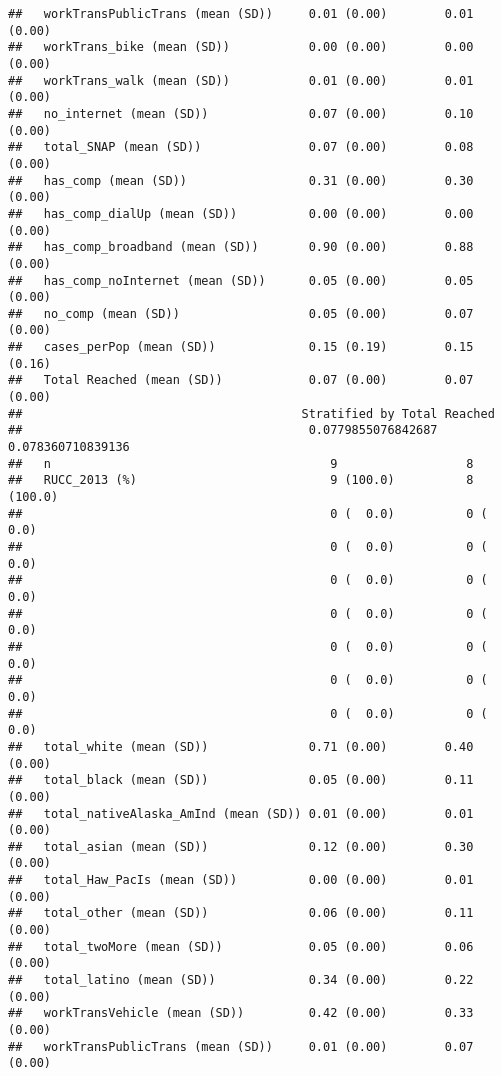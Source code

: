 \documentclass[
]{article}
\begin{document}
\begin{verbatim}
##   workTransPublicTrans (mean (SD))     0.01 (0.00)        0.01 (0.00)       
##   workTrans_bike (mean (SD))           0.00 (0.00)        0.00 (0.00)       
##   workTrans_walk (mean (SD))           0.01 (0.00)        0.01 (0.00)       
##   no_internet (mean (SD))              0.07 (0.00)        0.10 (0.00)       
##   total_SNAP (mean (SD))               0.07 (0.00)        0.08 (0.00)       
##   has_comp (mean (SD))                 0.31 (0.00)        0.30 (0.00)       
##   has_comp_dialUp (mean (SD))          0.00 (0.00)        0.00 (0.00)       
##   has_comp_broadband (mean (SD))       0.90 (0.00)        0.88 (0.00)       
##   has_comp_noInternet (mean (SD))      0.05 (0.00)        0.05 (0.00)       
##   no_comp (mean (SD))                  0.05 (0.00)        0.07 (0.00)       
##   cases_perPop (mean (SD))             0.15 (0.19)        0.15 (0.16)       
##   Total Reached (mean (SD))            0.07 (0.00)        0.07 (0.00)       
##                                       Stratified by Total Reached
##                                        0.0779855076842687 0.078360710839136
##   n                                       9                  8             
##   RUCC_2013 (%)                           9 (100.0)          8 (100.0)     
##                                           0 (  0.0)          0 (  0.0)     
##                                           0 (  0.0)          0 (  0.0)     
##                                           0 (  0.0)          0 (  0.0)     
##                                           0 (  0.0)          0 (  0.0)     
##                                           0 (  0.0)          0 (  0.0)     
##                                           0 (  0.0)          0 (  0.0)     
##                                           0 (  0.0)          0 (  0.0)     
##   total_white (mean (SD))              0.71 (0.00)        0.40 (0.00)      
##   total_black (mean (SD))              0.05 (0.00)        0.11 (0.00)      
##   total_nativeAlaska_AmInd (mean (SD)) 0.01 (0.00)        0.01 (0.00)      
##   total_asian (mean (SD))              0.12 (0.00)        0.30 (0.00)      
##   total_Haw_PacIs (mean (SD))          0.00 (0.00)        0.01 (0.00)      
##   total_other (mean (SD))              0.06 (0.00)        0.11 (0.00)      
##   total_twoMore (mean (SD))            0.05 (0.00)        0.06 (0.00)      
##   total_latino (mean (SD))             0.34 (0.00)        0.22 (0.00)      
##   workTransVehicle (mean (SD))         0.42 (0.00)        0.33 (0.00)      
##   workTransPublicTrans (mean (SD))     0.01 (0.00)        0.07 (0.00)      

\end{verbatim}
\end{document}
